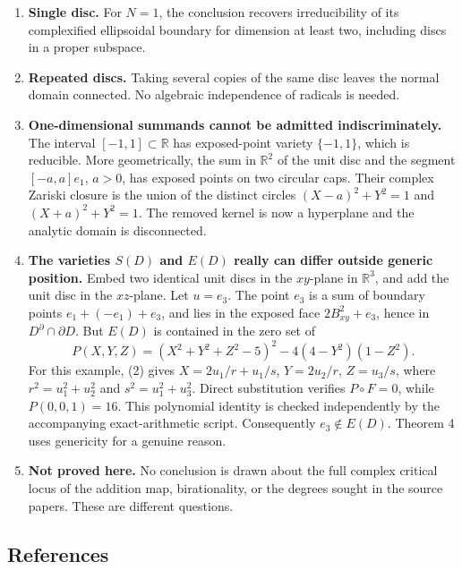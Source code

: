 \documentclass[
  11pt,
  letterpaper,
]{article}
\providecommand{\tightlist}{%
  \setlength{\itemsep}{0pt}\setlength{\parskip}{0pt}}
\begin{document}
\begin{enumerate}
\def\labelenumi{\arabic{enumi}.}
\tightlist
\item
  \textbf{Single disc.} For \(N=1\), the conclusion recovers
  irreducibility of its complexified ellipsoidal boundary for dimension
  at least two, including discs in a proper subspace.
\item
  \textbf{Repeated discs.} Taking several copies of the same disc leaves
  the normal domain connected. No algebraic independence of radicals is
  needed.
\item
  \textbf{One-dimensional summands cannot be admitted indiscriminately.}
  The interval \([-1,1]\subset\mathbb R\) has exposed-point variety
  \(\{-1,1\}\), which is reducible. More geometrically, the sum in
  \(\mathbb R^2\) of the unit disc and the segment \([-a,a]e_1\),
  \(a>0\), has exposed points on two circular caps. Their complex
  Zariski closure is the union of the distinct circles \((X-a)^2+Y^2=1\)
  and \((X+a)^2+Y^2=1\). The removed kernel is now a hyperplane and the
  analytic domain is disconnected.
\item
  \textbf{The varieties \(S(D)\) and \(E(D)\) really can differ outside
  generic position.} Embed two identical unit discs in the \(xy\)-plane
  in \(\mathbb R^3\), and add the unit disc in the \(xz\)-plane. Let
  \(u=e_3\). The point \(e_3\) is a sum of boundary points
  \(e_1+(-e_1)+e_3\), and lies in the exposed face \(2B^2_{xy}+e_3\),
  hence in \(D^{\partial}\cap\partial D\). But \(E(D)\) is contained in
  the zero set of \[
  P(X,Y,Z)=(X^2+Y^2+Z^2-5)^2-4(4-Y^2)(1-Z^2).
  \] For this example, (2) gives \(X=2u_1/r+u_1/s\), \(Y=2u_2/r\),
  \(Z=u_3/s\), where \(r^2=u_1^2+u_2^2\) and \(s^2=u_1^2+u_3^2\). Direct
  substitution verifies \(P\circ F=0\), while \(P(0,0,1)=16\). This
  polynomial identity is checked independently by the accompanying
  exact-arithmetic script. Consequently \(e_3\notin E(D)\). Theorem 4
  uses genericity for a genuine reason.
\item
  \textbf{Not proved here.} No conclusion is drawn about the full
  complex critical locus of the addition map, birationality, or the
  degrees sought in the source papers. These are different questions.
\end{enumerate}

\subsection{References}\label{references}
\end{document}
